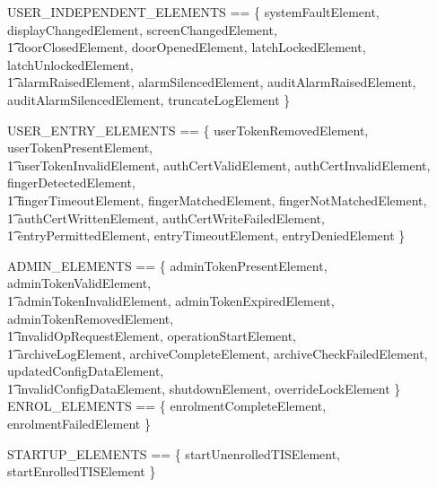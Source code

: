 \begin{zed}
        USER\_INDEPENDENT\_ELEMENTS == \{ systemFaultElement,
        displayChangedElement,
        screenChangedElement,
\\ \t1  doorClosedElement,
        doorOpenedElement,
        latchLockedElement,
        latchUnlockedElement,
\\ \t1  alarmRaisedElement,
        alarmSilencedElement,
        auditAlarmRaisedElement,
        auditAlarmSilencedElement,
        truncateLogElement \}

\also
        USER\_ENTRY\_ELEMENTS == \{ 
        userTokenRemovedElement,
        userTokenPresentElement,
\\ \t1        userTokenInvalidElement,
         authCertValidElement,
        authCertInvalidElement,
        fingerDetectedElement,
\\ \t1  fingerTimeoutElement,
         fingerMatchedElement,
         fingerNotMatchedElement,
\\ \t1   authCertWrittenElement,
         authCertWriteFailedElement,
\\ \t1   entryPermittedElement,
         entryTimeoutElement,
         entryDeniedElement \}

\also
        ADMIN\_ELEMENTS == \{ 
        adminTokenPresentElement,
        adminTokenValidElement,
\\ \t1         adminTokenInvalidElement,
        adminTokenExpiredElement,
         adminTokenRemovedElement,
\\ \t1   invalidOpRequestElement,
         operationStartElement,
\\ \t1         archiveLogElement,
        archiveCompleteElement,
         archiveCheckFailedElement,
         updatedConfigDataElement,
\\ \t1   invalidConfigDataElement,
        shutdownElement,
        overrideLockElement \}
\also
        ENROL\_ELEMENTS == \{ 
         enrolmentCompleteElement,
         enrolmentFailedElement \}

\also
        STARTUP\_ELEMENTS == \{ 
       startUnenrolledTISElement,
         startEnrolledTISElement \}


\end{zed}
